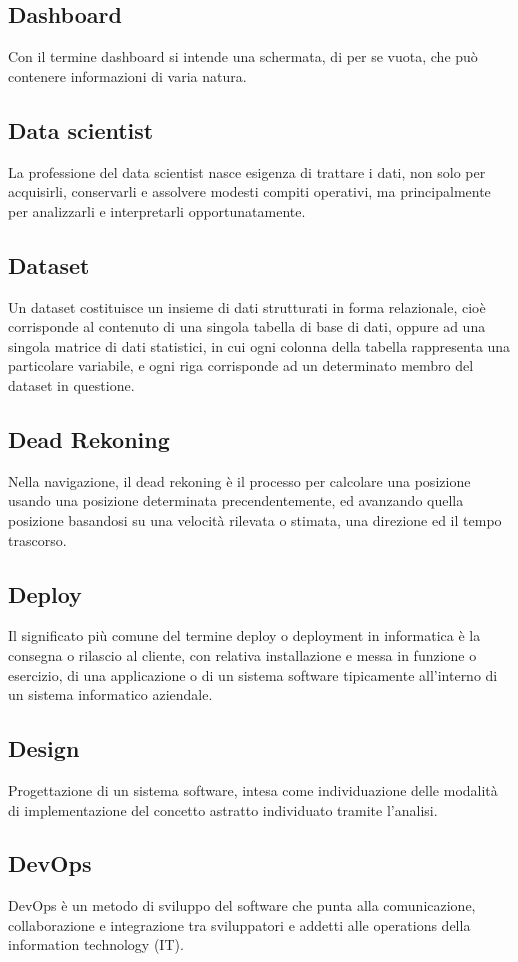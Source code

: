 \subsection{Dashboard}  Con il termine dashboard si intende una schermata, di per se vuota, che può contenere informazioni di varia natura.
\subsection{Data scientist}  La professione del data scientist nasce esigenza di trattare i dati, non solo per acquisirli, conservarli e assolvere modesti compiti operativi, ma principalmente per analizzarli e interpretarli opportunatamente.
\subsection{Dataset}  Un dataset costituisce un insieme di dati strutturati in forma relazionale, cioè corrisponde al contenuto di una singola tabella di base di dati, oppure ad una singola matrice di dati statistici, in cui ogni colonna della tabella rappresenta una particolare variabile, e ogni riga corrisponde ad un determinato membro del dataset in questione.
\subsection{Dead Rekoning}  Nella navigazione, il dead rekoning è il processo per calcolare una posizione usando una posizione determinata precendentemente, ed avanzando quella posizione basandosi su una velocità rilevata o stimata, una direzione ed il tempo trascorso.
\subsection{Deploy}  Il significato più comune del termine deploy o deployment in informatica è la consegna o rilascio al cliente, con relativa installazione e messa in funzione o esercizio, di una applicazione o di un sistema software tipicamente all'interno di un sistema informatico aziendale.
\subsection{Design}  Progettazione di un sistema software, intesa come individuazione delle modalità di implementazione del concetto astratto individuato tramite l'analisi.
\subsection{DevOps}  DevOps è un metodo di sviluppo del software che punta alla comunicazione, collaborazione e integrazione tra sviluppatori e addetti alle operations della information technology (IT).

